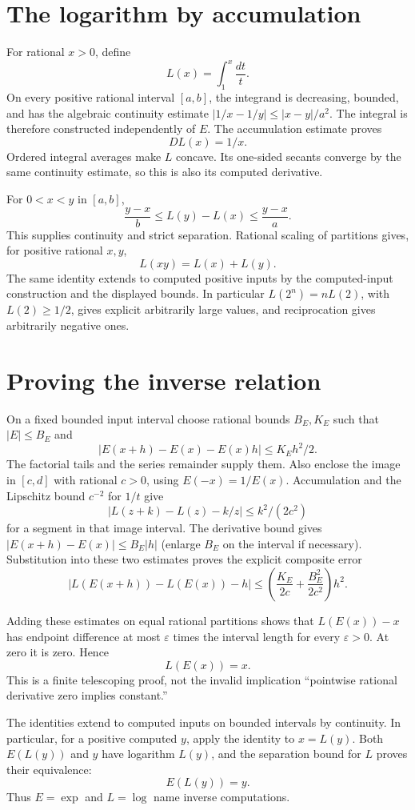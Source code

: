 \section{The logarithm by accumulation}
For rational $x>0$, define
\[
 L(x)=\int_1^x\frac{dt}{t}.
\]
On every positive rational interval $[a,b]$, the integrand is decreasing,
bounded, and has the algebraic continuity estimate
$|1/x-1/y|\le |x-y|/a^2$.  The integral is therefore constructed
independently of $E$.  The accumulation estimate proves
\[
 DL(x)=1/x.
\]
Ordered integral averages make $L$ concave.  Its one-sided secants converge
by the same continuity estimate, so this is also its computed derivative.

For $0<x<y$ in $[a,b]$,
\[
 \frac{y-x}{b}\le L(y)-L(x)\le\frac{y-x}{a}.
\]
This supplies continuity and strict separation.  Rational scaling of
partitions gives, for positive rational $x,y$,
\[
 L(xy)=L(x)+L(y).
\]
The same identity extends to computed positive inputs by the
computed-input construction and the displayed bounds.  In particular
$L(2^n)=nL(2)$, with $L(2)\ge1/2$, gives explicit arbitrarily large
values, and reciprocation gives arbitrarily negative ones.

\section{Proving the inverse relation}
On a fixed bounded input interval choose rational bounds $B_E,K_E$ such
that $|E|\le B_E$ and
\[
 |E(x+h)-E(x)-E(x)h|\le K_Eh^2/2.
\]
The factorial tails and the series remainder supply them.  Also enclose
the image in $[c,d]$ with rational $c>0$, using $E(-x)=1/E(x)$.
Accumulation and the Lipschitz bound $c^{-2}$ for $1/t$ give
\[
 |L(z+k)-L(z)-k/z|\le k^2/(2c^2)
\]
for a segment in that image interval.  The derivative bound gives
$|E(x+h)-E(x)|\le B_E|h|$ (enlarge $B_E$ on the interval if necessary).
Substitution into these two estimates proves the explicit composite error
\[
 |L(E(x+h))-L(E(x))-h|
 \le\left(\frac{K_E}{2c}+\frac{B_E^2}{2c^2}\right)h^2.
\]

Adding these estimates on equal rational partitions shows that
$L(E(x))-x$ has endpoint difference at most
$\varepsilon$ times the interval length for every $\varepsilon>0$.
At zero it is zero.  Hence
\[
 L(E(x))=x.
\]
This is a finite telescoping proof, not the invalid implication
``pointwise rational derivative zero implies constant.''

The identities extend to computed inputs on bounded intervals by
continuity.  In particular, for a positive computed $y$, apply the identity
to $x=L(y)$.  Both $E(L(y))$ and $y$ have logarithm $L(y)$, and the
separation bound for $L$ proves their equivalence:
\[
 E(L(y))=y.
\]
Thus $E=\exp$ and $L=\log$ name inverse computations.

